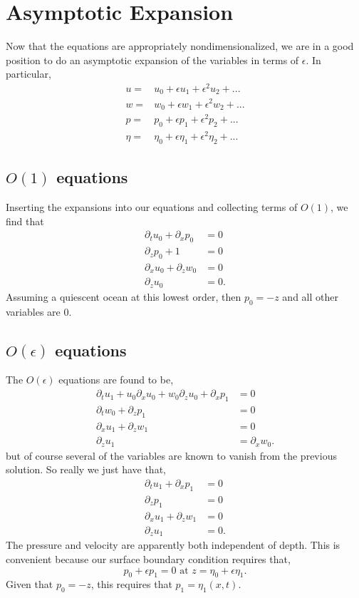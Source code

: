 \documentclass[11pt]{article}
\begin{document}
\section{Asymptotic Expansion}
Now that the equations are appropriately nondimensionalized, we are in a good position to do an asymptotic expansion of the variables in terms of $\epsilon$. In particular,
\begin{align}
u =& u_0 + \epsilon u_1 + \epsilon^2 u_2 + ... \\
w =& w_0 + \epsilon w_1 + \epsilon^2 w_2 + ... \\
p =& p_0 + \epsilon p_1 + \epsilon^2 p_2 + ... \\
\eta =& \eta_0 + \epsilon \eta_1 + \epsilon^2 \eta_2 + ...
\end{align}

\subsection{$O(1)$ equations}
Inserting the expansions into our equations and collecting terms of $O(1)$, we find that
\begin{align}
\partial_t u_0 +  \partial_x p_0 &=0 \\
\partial_z p_0 + 1 &=0 \\
\partial_x u_0 + \partial_z w_0 &= 0 \\
\partial_z u_0 &= 0.
\end{align}
Assuming a quiescent ocean at this lowest order, then $p_0=-z$ and all other variables are $0$.

\subsection{$O(\epsilon)$ equations}
The $O(\epsilon)$ equations are found to be,
\begin{align}
\partial_t u_1 + u_0 \partial_x u_0 + w_0 \partial_z u_0 + \partial_x p_1 &=0 \\
\partial_t w_0  + \partial_z p_1  &=0 \\
\partial_x u_1 + \partial_z w_1 &= 0 \\
\partial_z u_1 &= \partial_x w_0.
\end{align}
but of course several of the variables are known to vanish from the previous solution. So really we just have that,
\begin{align}
\partial_t u_1 + \partial_x p_1 &=0 \\
 \partial_z p_1  &=0 \\
\partial_x u_1 + \partial_z w_1 &= 0 \\
\partial_z u_1 &= 0.
\end{align}
The pressure and velocity are apparently both independent of depth. This is convenient because our surface boundary condition requires that,
\begin{equation}
p_0 + \epsilon p_1 = 0 \textrm{ at } z=\eta_0 + \epsilon \eta_1.
\end{equation}
Given that $p_0=-z$, this requires that $p_1=\eta_1(x,t)$.
\end{document}
